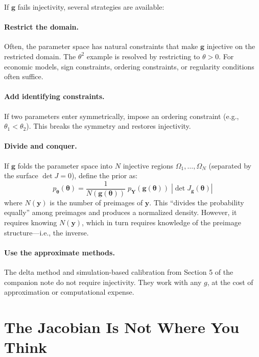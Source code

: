 \documentclass[11pt,a4paper]{article}
\theoremstyle{definition}
\newcommand{\btheta}{\boldsymbol{\theta}}
\begin{document}
If $\mathbf{g}$ fails injectivity, several strategies are available:

\paragraph{Restrict the domain.} Often, the parameter space has natural
constraints that make $\mathbf{g}$ injective on the restricted domain.
The $\theta^2$ example is resolved by restricting to $\theta > 0$. For
economic models, sign constraints, ordering constraints, or regularity
conditions often suffice.

\paragraph{Add identifying constraints.} If two parameters enter
symmetrically, impose an ordering constraint (e.g., $\theta_1 < \theta_2$).
This breaks the symmetry and restores injectivity.

\paragraph{Divide and conquer.} If $\mathbf{g}$ folds the parameter space into
$N$ injective regions $\Omega_1, \ldots, \Omega_N$ (separated by the surface
$\det J = 0$), define the prior as:
\begin{equation}
    p_{\btheta}(\btheta) = \frac{1}{N(\mathbf{g}(\btheta))} \;
    p_{\mathbf{Y}}(\mathbf{g}(\btheta)) \; |\!\det J_{\mathbf{g}}(\btheta)|
\end{equation}
where $N(\mathbf{y})$ is the number of preimages of $\mathbf{y}$. This
``divides the probability equally'' among preimages and produces a normalized
density. However, it requires knowing $N(\mathbf{y})$, which in turn requires
knowledge of the preimage structure---i.e., the inverse.

\paragraph{Use the approximate methods.} The delta method and simulation-based
calibration from Section 5 of the companion note do not require injectivity.
They work with any $g$, at the cost of approximation or computational expense.


\section{The Jacobian Is Not Where You Think}
\label{sec:confusion}
\end{document}

